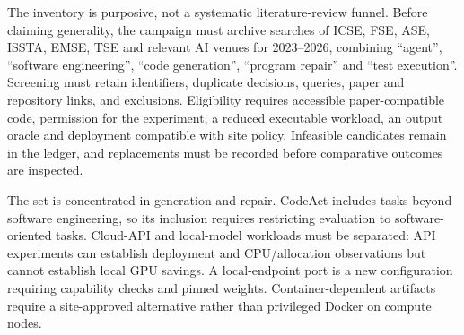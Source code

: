 \documentclass[pdflatex,sn-mathphys-num]{sn-jnl}
\theoremstyle{thmstylethree}
\begin{document}
\begin{table}[t]

\end{table}

The inventory is purposive, not a systematic literature-review funnel. Before claiming generality, the campaign must archive searches of ICSE, FSE, ASE, ISSTA, EMSE, TSE and relevant AI venues for 2023--2026, combining ``agent'', ``software engineering'', ``code generation'', ``program repair'' and ``test execution''. Screening must retain identifiers, duplicate decisions, queries, paper and repository links, and exclusions. Eligibility requires accessible paper-compatible code, permission for the experiment, a reduced executable workload, an output oracle and deployment compatible with site policy. Infeasible candidates remain in the ledger, and replacements must be recorded before comparative outcomes are inspected.

The set is concentrated in generation and repair. CodeAct includes tasks beyond software engineering, so its inclusion requires restricting evaluation to software-oriented tasks. Cloud-API and local-model workloads must be separated: API experiments can establish deployment and CPU/allocation observations but cannot establish local GPU savings. A local-endpoint port is a new configuration requiring capability checks and pinned weights. Container-dependent artifacts require a site-approved alternative rather than privileged Docker on compute nodes.
\end{document}
